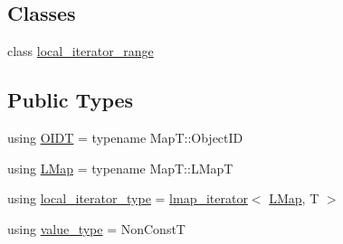 \subsection*{Classes}
\begin{DoxyCompactItemize}
\item 
class \hyperlink{classshad_1_1map__iterator_1_1local__iterator__range}{local\-\_\-iterator\-\_\-range}
\end{DoxyCompactItemize}
\subsection*{Public Types}
\begin{DoxyCompactItemize}
\item 
using \hyperlink{classshad_1_1map__iterator_aecdaced930b9dcb48d5eff9ef992fbd5}{O\-I\-D\-T} = typename Map\-T\-::\-Object\-I\-D
\item 
using \hyperlink{classshad_1_1map__iterator_a157d8b69a2befd7e61c0df9eb52b2a71}{L\-Map} = typename Map\-T\-::\-L\-Map\-T
\item 
using \hyperlink{classshad_1_1map__iterator_adceb72a3948aa860edd3a4c9ceca821d}{local\-\_\-iterator\-\_\-type} = \hyperlink{classshad_1_1lmap__iterator}{lmap\-\_\-iterator}$<$ \hyperlink{classshad_1_1map__iterator_a157d8b69a2befd7e61c0df9eb52b2a71}{L\-Map}, T $>$
\item 
using \hyperlink{classshad_1_1map__iterator_a77b746659dcccbde295013e95ac929bf}{value\-\_\-type} = Non\-Const\-T
\end{DoxyCompactItemize}

